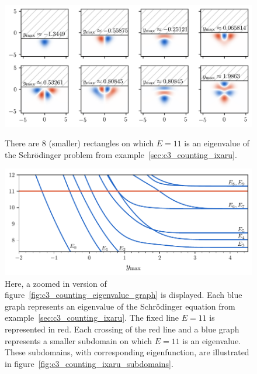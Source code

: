 \begin{figure}
  \begin{center}
    \includegraphics[width=1\textwidth]{img/chapter3/counting/ixaru.png}
  \end{center}
  \caption{There are 8 (smaller) rectangles on which $E = 11$ is an eigenvalue of the Schrödinger problem from example~\ref{sec:c3_counting_ixaru}.}\label{fig:c3_counting_ixaru_subdomains}
  \vspace{1cm}
  \begin{center}
    \includegraphics[width=1\textwidth]{img/chapter3/counting/counting_eigenvalues_zoom.pdf}
  \end{center}
  \caption{Here, a zoomed in version of figure~\ref{fig:c3_counting_eigenvalue_graph} is displayed. Each blue graph represents an eigenvalue of the Schrödinger equation from example~\ref{sec:c3_counting_ixaru}. The fixed line $E = 11$ is represented in red. Each crossing of the red line and a blue graph represents a smaller subdomain on which $E=11$ is an eigenvalue. These subdomains, with corresponding eigenfunction, are illustrated in figure~\ref{fig:c3_counting_ixaru_subdomains}.}\label{fig:counting_eigenvalues_zoom}
\end{figure}

